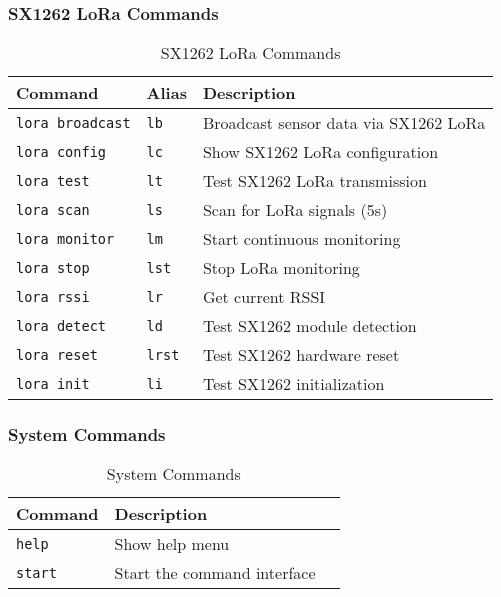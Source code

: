 \documentclass[11pt,a4paper]{article}
\begin{document}
\subsubsection{SX1262 LoRa Commands}
\begin{table}[h]
\centering
\begin{tabular}{|l|l|l|}
\hline
\textbf{Command} & \textbf{Alias} & \textbf{Description} \\
\hline
\texttt{lora broadcast} & \texttt{lb} & Broadcast sensor data via SX1262 LoRa \\
\hline
\texttt{lora config} & \texttt{lc} & Show SX1262 LoRa configuration \\
\hline
\texttt{lora test} & \texttt{lt} & Test SX1262 LoRa transmission \\
\hline
\texttt{lora scan} & \texttt{ls} & Scan for LoRa signals (5s) \\
\hline
\texttt{lora monitor} & \texttt{lm} & Start continuous monitoring \\
\hline
\texttt{lora stop} & \texttt{lst} & Stop LoRa monitoring \\
\hline
\texttt{lora rssi} & \texttt{lr} & Get current RSSI \\
\hline
\texttt{lora detect} & \texttt{ld} & Test SX1262 module detection \\
\hline
\texttt{lora reset} & \texttt{lrst} & Test SX1262 hardware reset \\
\hline
\texttt{lora init} & \texttt{li} & Test SX1262 initialization \\
\hline
\end{tabular}
\caption{SX1262 LoRa Commands}
\end{table}

\subsubsection{System Commands}
\begin{table}[h]
\centering
\begin{tabular}{|l|l|l|}
\hline
\textbf{Command} & \textbf{Description} \\
\hline
\texttt{help} & Show help menu \\
\hline
\texttt{start} & Start the command interface \\
\hline
\end{tabular}
\caption{System Commands}
\end{table}
\end{document}
